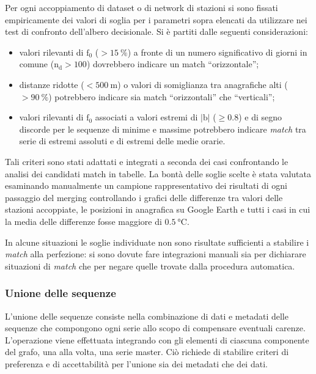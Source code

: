 Per ogni accoppiamento di dataset o di network di stazioni si sono fissati empiricamente dei valori di soglia per i parametri sopra elencati da utilizzare nei test di confronto dell'albero decisionale. Si è partiti dalle seguenti considerazioni:

\begin{itemize}
  \item
    valori rilevanti di \(\mathrm{f}_0\) (\(> \qty{15}{\percent}\)) a fronte di un numero significativo di giorni in comune (\(\mathrm{n_d} > 100\)) dovrebbero indicare un match ``orizzontale'';
  \item
    distanze ridotte (\(< 500\:\mathrm{m}\)) o valori di somiglianza tra anagrafiche alti (\(> \qty{90}{\percent}\)) potrebbero indicare sia match ``orizzontali'' che ``verticali'';
  \item
    valori rilevanti di \(\mathrm{f}_0\) associati a valori estremi di \(|\mathrm{b}|\) (\(\ge 0.8\)) e di segno discorde per le sequenze di minime e massime potrebbero indicare \emph{match} tra serie di estremi assoluti e di estremi delle medie orarie.
\end{itemize}

Tali criteri sono stati adattati e integrati a seconda dei casi confrontando le analisi dei candidati match in tabelle. La bontà delle soglie scelte è stata valutata esaminando manualmente un campione rappresentativo dei risultati di ogni passaggio del merging controllando i grafici delle differenze tra valori delle stazioni accoppiate, le posizioni in anagrafica su Google Earth e tutti i casi in cui la media delle differenze fosse maggiore di \(\qty{0.5}{\degreeCelsius}\).

In alcune situazioni le soglie individuate non sono risultate sufficienti a stabilire i \emph{match} alla perfezione: si sono dovute fare integrazioni manuali sia per dichiarare situazioni di \emph{match} che per negare quelle trovate dalla procedura automatica.

\subsubsection{Unione delle sequenze}
L'unione delle sequenze consiste nella combinazione di dati e metadati delle sequenze che compongono ogni serie allo scopo di compensare eventuali carenze. L'operazione viene effettuata integrando con gli elementi di ciascuna componente del grafo, una alla volta, una serie master. Ciò richiede di stabilire criteri di preferenza e di accettabilità per l'unione sia dei metadati che dei dati.

